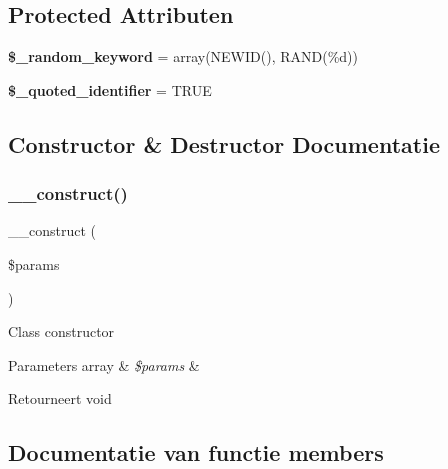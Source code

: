 \subsection*{Protected Attributen}
\begin{DoxyCompactItemize}
\item 
\mbox{\label{class_c_i___d_b__sqlsrv__driver_a10213aa6e05f6d924d3277bb1d2fea00}} 
{\bfseries \$\+\_\+random\+\_\+keyword} = array(\textquotesingle{}N\+E\+W\+ID()\textquotesingle{}, \textquotesingle{}R\+A\+ND(\%d)\textquotesingle{})
\item 
\mbox{\label{class_c_i___d_b__sqlsrv__driver_a1dae2f0e9ad7299438a9976d6cdbf2ad}} 
{\bfseries \$\+\_\+quoted\+\_\+identifier} = T\+R\+UE
\end{DoxyCompactItemize}


\subsection{Constructor \& Destructor Documentatie}
\mbox{\label{class_c_i___d_b__sqlsrv__driver_a9162320adff1a1a4afd7f2372f753a3e}} 
\subsubsection{\texorpdfstring{\_\_construct()}{\_\_construct()}}
{\footnotesize\ttfamily \+\_\+\+\_\+construct (\begin{DoxyParamCaption}\item[{}]{\$params }\end{DoxyParamCaption})}

Class constructor


\begin{DoxyParams}[1]{Parameters}
array & {\em \$params} & \\
\hline
\end{DoxyParams}
\begin{DoxyReturn}{Retourneert}
void 
\end{DoxyReturn}


\subsection{Documentatie van functie members}
\mbox{\label{class_c_i___d_b__sqlsrv__driver_a4d9082658000e5ede8312067c6dda9db}} 
